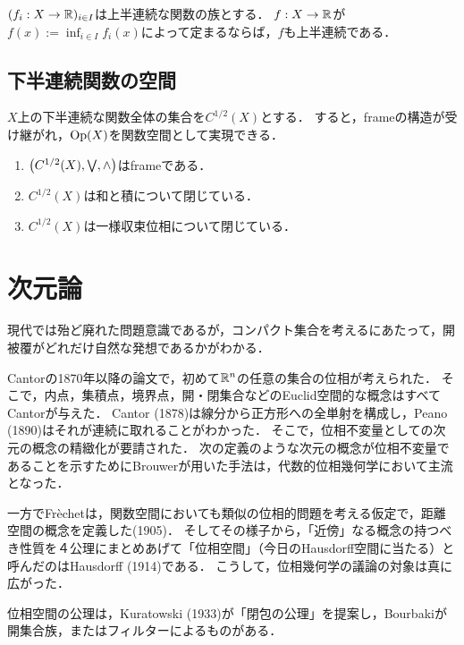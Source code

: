 \documentclass[uplatex,dvipdfmx]{jsreport}
\begin{document}
\begin{proposition}[上半連続性の保存]
    $(f_i:X\to\mathbb{R})_{i\in I}$は上半連続な関数の族とする．
    $f:X\to\mathbb{R}$が$f(x):=\inf_{i\in I}f_i(x)$によって定まるならば，$f$も上半連続である．
\end{proposition}

\subsection{下半連続関数の空間}

\begin{tcolorbox}[colframe=ForestGreen, colback=ForestGreen!10!white,breakable,colbacktitle=ForestGreen!40!white,coltitle=black,fonttitle=\bfseries\sffamily,
    title=]
    $X$上の下半連続な関数全体の集合を$C^{1/2}(X)$とする．
    すると，frameの構造が受け継がれ，$\mathrm{Op}(X)$を関数空間として実現できる．
\end{tcolorbox}

\begin{proposition}\mbox{}
    \begin{enumerate}
        \item $\left(C^{1/2}(X),\bigvee,\land\right)$はframeである．
        \item $C^{1/2}(X)$は和と積について閉じている．
        \item $C^{1/2}(X)$は一様収束位相について閉じている．
    \end{enumerate}
\end{proposition}

\section{次元論}

\begin{tcolorbox}[colframe=ForestGreen, colback=ForestGreen!10!white,breakable,colbacktitle=ForestGreen!40!white,coltitle=black,fonttitle=\bfseries\sffamily,
title=]
    現代では殆ど廃れた問題意識であるが，コンパクト集合を考えるにあたって，開被覆がどれだけ自然な発想であるかがわかる．
\end{tcolorbox}

\begin{history}
    Cantorの1870年以降の論文で，初めて$\mathbb{R}^n$の任意の集合の位相が考えられた．
    そこで，内点，集積点，境界点，開・閉集合などのEuclid空間的な概念はすべてCantorが与えた．
    Cantor (1878)は線分から正方形への全単射を構成し，Peano (1890)はそれが連続に取れることがわかった．
    そこで，位相不変量としての次元の概念の精緻化が要請された．
    次の定義のような次元の概念が位相不変量であることを示すためにBrouwerが用いた手法は，代数的位相幾何学において主流となった．

    一方でFr\`{e}chetは，関数空間においても類似の位相的問題を考える仮定で，距離空間の概念を定義した(1905)．
    そしてその様子から，「近傍」なる概念の持つべき性質を４公理にまとめあげて「位相空間」（今日のHausdorff空間に当たる）と呼んだのはHausdorff (1914)である．
    こうして，位相幾何学の議論の対象は真に広がった．

    位相空間の公理は，Kuratowski (1933)が「閉包の公理」を提案し，Bourbakiが開集合族，またはフィルターによるものがある．
    
\end{history}
\end{document}
